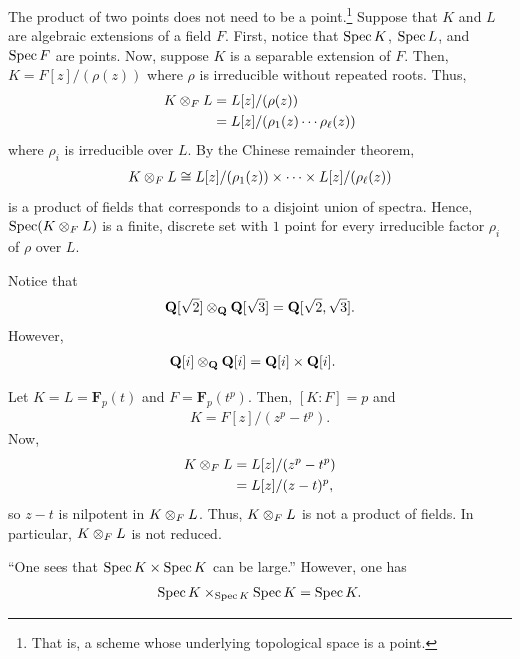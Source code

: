 \documentclass [11 pt, oneside] {article}
\begin{document}
\begin{remark}
	The product of two points does not need to be a point.\footnote{That is, a scheme whose underlying topological space is a point.} Suppose that $K$ and $L$ are algebraic extensions of a field $F$. First, notice that $\operatorname{Spec} K$, $\operatorname{Spec} L$, and $\operatorname{Spec} F$ are points. Now, suppose $K$ is a separable extension of $F$. Then, $K = F[z]/(\rho(z))$ where $\rho$ is irreducible without repeated roots. Thus,
	\begin{align*}
		K\otimes_F L &= L[z]/(\rho(z)) \\
			     &= L[z]/(\rho_1(z)\cdots\rho_\ell (z))
	\end{align*}
	where $\rho_i$ is irreducible over $L$. By the Chinese remainder theorem,
	\begin{align*}
		K\otimes_F L \cong L[z] /(\rho_1(z)) \times \cdots\times L[z]/(\rho_\ell(z))
	\end{align*}
	is a product of fields that corresponds to a disjoint union of spectra. Hence, $\operatorname{Spec}(K\otimes_F L)$ is a finite, discrete set with $1$ point for every irreducible factor $\rho_i$ of $\rho$ over $L$.
\end{remark}

\begin{example}[ ]\label{}\text{}
Notice that
\begin{align*}
	\mathbf{Q}[\sqrt{2} ] \otimes_\mathbf{Q} \mathbf{Q}[\sqrt{3} ] = \mathbf{Q}[\sqrt{2} ,\sqrt{3} ].
\end{align*}
However,
\begin{align*}
	\mathbf{Q}[i] \otimes_\mathbf{Q} \mathbf{Q}[i] &= \mathbf{Q}[i] \times \mathbf{Q}[i].
\end{align*}
\end{example}

\begin{example}\label{}\text{}
Let $K=L= \mathbf{F}_{p}(t)$ and $F = \mathbf{F}_{p}(t^p)$. Then, $[K:F] = p$ and 
\begin{align*}
	K = F[z] /(z^p - t^p).
\end{align*}
Now, 
\begin{align*}
	K\otimes _FL &= L[z]/(z^p-t^p)\\&= L[z]/ (z-t)^p,
\end{align*}
so $z-t$ is nilpotent in $K\otimes _F L$. Thus, $K\otimes _F L$ is not a product of fields. In particular, $K\otimes_F L$ is not reduced.
\end{example}
\begin{remark}
	``One sees that $\operatorname{Spec} K\times \operatorname{Spec} K$ can be large.'' However, one has
	\begin{align*}
		\operatorname{Spec} K\times_{\operatorname{Spec} K} \operatorname{Spec} K = \operatorname{Spec} K.
	\end{align*}
\end{remark}
\end{document}
